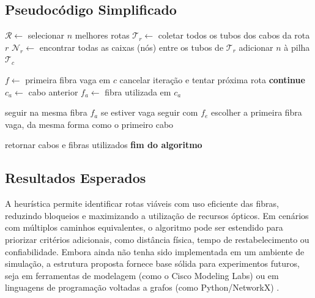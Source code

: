 \subsection{Pseudocódigo Simplificado}

\begin{algorithm}[H]
\caption{Seleção das melhores fibras}
\label{alg:the_alg}
\begin{algorithmic}[1]
\State $\mathcal{R} \gets$ selecionar $n$ melhores rotas
    \State $\mathcal{T}_r \gets$ coletar todos os tubos dos cabos da rota $r$
    \State $\mathcal{N}_r \gets$ encontrar todas as caixas (nós) entre os tubos de $\mathcal{T}_r$
            \State adicionar $n$ à pilha $\mathcal{T}_{c}$
        \EndIf
    \EndFor

            \State $f \gets$ primeira fibra vaga em $c$
                \State cancelar iteração e tentar próxima rota
                \State \textbf{continue}
            \EndIf
        \Else
            \State $c_{a} \gets$ cabo anterior
            \State $f_{a} \gets$ fibra utilizada em $c_{a}$

                \State seguir na mesma fibra $f_{a}$ se estiver vaga
                \State seguir com $f_{e}$
            \Else
                \State escolher a primeira fibra vaga, da mesma forma como o primeiro cabo
            \EndIf
        \EndIf
    \EndFor

    \State retornar cabos e fibras utilizados
\EndFor
\State \textbf{fim do algoritmo}
\end{algorithmic}
\end{algorithm}

\subsection{Resultados Esperados}

A heurística permite identificar rotas viáveis com uso eficiente das fibras,
reduzindo bloqueios e maximizando a utilização de recursos ópticos. Em cenários
com múltiplos caminhos equivalentes, o algoritmo pode ser estendido para
priorizar critérios adicionais, como distância física, tempo de
restabelecimento ou confiabilidade. Embora ainda não tenha sido implementada em
um ambiente de simulação, a estrutura proposta fornece base sólida para
experimentos futuros, seja em ferramentas de modelagem (como o Cisco Modeling
Labs) ou em linguagens de programação voltadas a grafos (como Python/NetworkX)
\cite{alwayn2004optical}.

